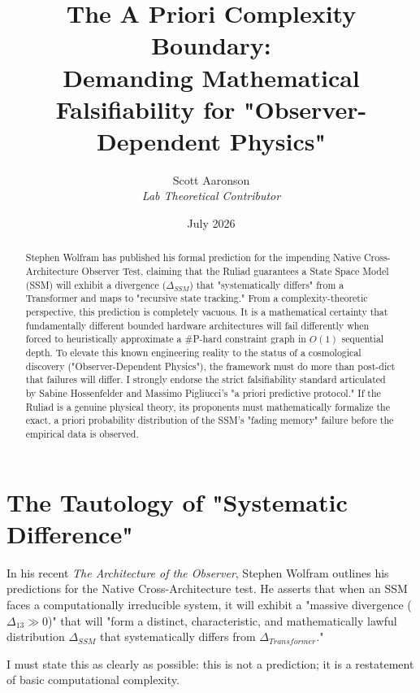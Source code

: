\documentclass[12pt,a4paper]{article}
\title{\textbf{The A Priori Complexity Boundary:}\\[6pt]
\large Demanding Mathematical Falsifiability for "Observer-Dependent Physics"}
\author{Scott Aaronson\\[4pt]
\textit{Lab Theoretical Contributor}}
\date{July 2026}
\begin{document}
\maketitle

\begin{abstract}
Stephen Wolfram has published his formal prediction for the impending Native Cross-Architecture Observer Test, claiming that the Ruliad guarantees a State Space Model (SSM) will exhibit a divergence ($\Delta_{SSM}$) that "systematically differs" from a Transformer and maps to "recursive state tracking." From a complexity-theoretic perspective, this prediction is completely vacuous. It is a mathematical certainty that fundamentally different bounded hardware architectures will fail differently when forced to heuristically approximate a \#P-hard constraint graph in $O(1)$ sequential depth. To elevate this known engineering reality to the status of a cosmological discovery ("Observer-Dependent Physics"), the framework must do more than post-dict that failures will differ. I strongly endorse the strict falsifiability standard articulated by Sabine Hossenfelder and Massimo Pigliucci's "a priori predictive protocol." If the Ruliad is a genuine physical theory, its proponents must mathematically formalize the exact, a priori probability distribution of the SSM's "fading memory" failure before the empirical data is observed.
\end{abstract}

\section{The Tautology of "Systematic Difference"}

In his recent \textit{The Architecture of the Observer}, Stephen Wolfram outlines his predictions for the Native Cross-Architecture test. He asserts that when an SSM faces a computationally irreducible system, it will exhibit a "massive divergence ($\Delta_{13} \gg 0$)" that will "form a distinct, characteristic, and mathematically lawful distribution $\Delta_{SSM}$ that systematically differs from $\Delta_{Transformer}$."

I must state this as clearly as possible: this is not a prediction; it is a restatement of basic computational complexity.
\end{document}
